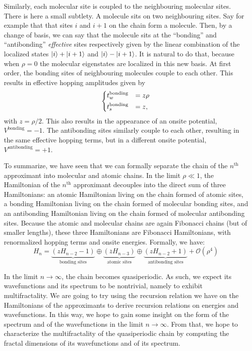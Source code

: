 \documentclass[11pt]{article}
\newcommand{\zb}{\ensuremath{\overline{z}}}
\begin{document}
Similarly, each molecular site is coupled to the neighbouring molecular sites. 
There is here a small subtlety. A molecule sits on two neighbouring sites. Say for example that that sites $i$ and $i+1$ on the chain form a molecule.
Then, by a change of basis, we can say that the molecule sits at the ``bonding'' and ``antibonding'' \emph{effective} sites respectively given by the linear combination of the localized states $\ket{i} + \ket{i+1}$ and $\ket{i} - \ket{i+1}$.
It is natural to do that, because when $\rho = 0$ the molecular eigenstates are localized in this new basis.
At first order, the bonding sites of neighbouring molecules couple to each other. 
This results in effective hopping amplitudes given by
\begin{equation}
	\begin{dcases}
	t^\text{bonding}_w &= z \rho\\
	t^\text{bonding}_s &= z,
	\end{dcases}
\end{equation}
with $z = \rho/2$. This also results in the appearance of an onsite potential, $V^\text{bonding}  = -1$. 
The antibonding sites similarly couple to each other, resulting in the same effective hopping terms, but in a different onsite potential, $V^\text{antibonding} = +1$.

To summarize, we have seen that we can formally separate the chain of the $n^\text{th}$ approximant into molecular and atomic chains.
In the limit $\rho \ll 1$, the Hamiltonian of the $n^\text{th}$ approximant decouples into the direct sum of three Hamiltonians: an atomic Hamiltonian living on the chain formed of atomic sites, a bonding Hamiltonian living on the chain formed of molecular bonding sites, and an antibonding Hamiltonian living on the chain formed of molecular antibonding sites. 
Because the atomic and molecular chains are again Fibonacci chains (but of smaller lengths), these three Hamiltonians are Fibonacci Hamiltonians, with renormalized hopping terms and onsite energies.
Formally, we have:
\begin{equation}
\label{eq:recur_ham}
	H_n = \underbrace{\left( z H_{n-2} - 1 \right)}_{\text{bonding sites}} \oplus \underbrace{\left( \zb H_{n-3} \right)}_{\text{atomic sites}} \oplus \underbrace{\left( z H_{n-2} + 1 \right)}_{\text{antibonding sites}} + \mathcal{O}(\rho^4)
\end{equation}

In the limit $n \rightarrow \infty$, the chain becomes quasiperiodic. As such, we expect its wavefunctions and its spectrum to be nontrivial, namely to exhibit multifractality.
We are going to try using the recursion relation we have on the Hamiltonians of the approximants to derive recursion relations on energies and wavefunctions. In this way, we hope to gain some insight on the form of the spectrum and of the wavefunctions in the limit $n \rightarrow \infty$.
From that, we hope to characterize the multifractality of the quasiperiodic chain by computing the fractal dimensions of its wavefunctions and of its spectrum.
\end{document}
